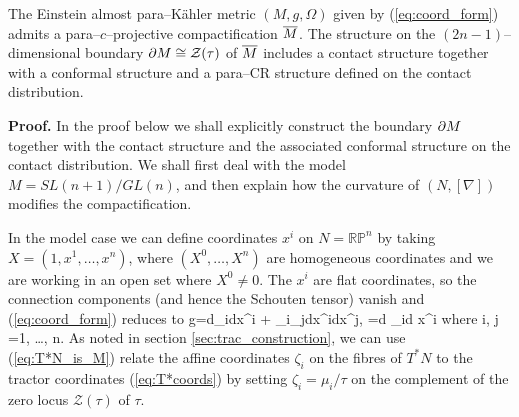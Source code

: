 


\begin{theo}
\label{our_thm}
The Einstein almost para--K\"ahler metric $(M, g, \Omega)$ given by 
(\ref{eq:coord_form}) admits a para--$c$--projective compactification
$\overline{M}$. The structure on the
$(2n-1)$--dimensional boundary $\partial M\cong \mathcal{Z}(\tau)$ of $\overline{M}$ includes a contact structure together with a conformal structure 
and a para--CR structure
defined on the contact distribution.
\end{theo}
\noindent
{\bf Proof.}
In the proof below we shall explicitly construct the boundary $\partial M$ together with the contact structure and the associated conformal structure on the contact distribution. We shall
first deal with the model $M=SL(n+1)/GL(n)$, and then explain how the curvature
of $(N, [\nabla])$ modifies the compactification.

In the model case we can define coordinates $x^i$ on $N=\mathbb{RP}^n$ by taking $X=(1,x^1,\dots,x^n)$, where $(X^0,\dots,X^n)$ are homogeneous coordinates and we are working in an open set where $X^0\neq 0$. The ${x^i}$ are flat coordinates, so the connection components (and hence the Schouten tensor) vanish and (\ref{eq:coord_form}) reduces to
\be
\label{model_metric}
g=d\zeta_i\odot dx^i + \zeta_i\zeta_jdx^i\odot dx^j, \qquad
\Omega=d \zeta_i\wedge d x^i \quad
\mbox{where}\quad
i, j =1, \dots, n.
\ee
As noted in section \ref{sec:trac_construction}, we can use (\ref{eq:T*N_is_M}) relate the affine coordinates $\zeta_i$ on the fibres of $T^*N$ to the tractor coordinates (\ref{eq:T*coords}) by setting $\zeta_i=\mu_i/\tau$ on the complement of the zero locus ${\mathcal Z}(\tau)$ of $\tau$.


